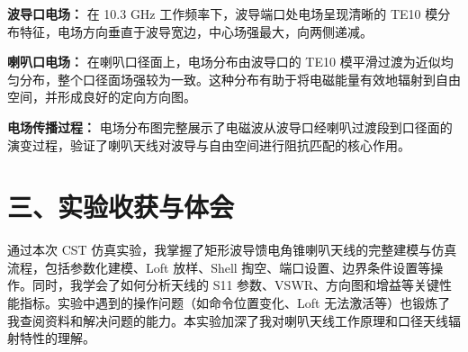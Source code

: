 \documentclass[12pt,a4paper]{article}
\begin{document}
\textbf{波导口电场：} 在 10.3 GHz 工作频率下，波导端口处电场呈现清晰的 TE10 模分布特征，电场方向垂直于波导宽边，中心场强最大，向两侧递减。

\textbf{喇叭口电场：} 在喇叭口径面上，电场分布由波导口的 TE10 模平滑过渡为近似均匀分布，整个口径面场强较为一致。这种分布有助于将电磁能量有效地辐射到自由空间，并形成良好的定向方向图。

\textbf{电场传播过程：} 电场分布图完整展示了电磁波从波导口经喇叭过渡段到口径面的演变过程，验证了喇叭天线对波导与自由空间进行阻抗匹配的核心作用。

\section*{三、实验收获与体会}

通过本次 CST 仿真实验，我掌握了矩形波导馈电角锥喇叭天线的完整建模与仿真流程，包括参数化建模、Loft 放样、Shell 掏空、端口设置、边界条件设置等操作。同时，我学会了如何分析天线的 S11 参数、VSWR、方向图和增益等关键性能指标。实验中遇到的操作问题（如命令位置变化、Loft 无法激活等）也锻炼了我查阅资料和解决问题的能力。本实验加深了我对喇叭天线工作原理和口径天线辐射特性的理解。
\end{document}

